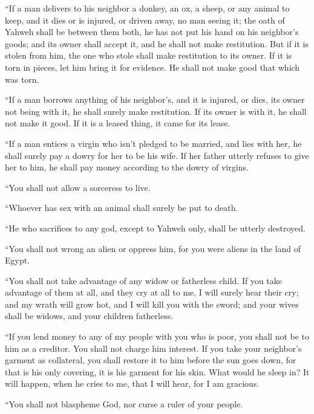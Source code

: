  ``If a man delivers to his neighbor a donkey, an ox, a
sheep, or any animal to keep, and it dies or is injured, or driven away,
no man seeing it;  the oath of Yahweh shall be between
them both, he has not put his hand on his neighbor's goods; and its
owner shall accept it, and he shall not make restitution.
 But if it is stolen from him, the one who stole shall
make restitution to its owner.  If it is torn in pieces,
let him bring it for evidence. He shall not make good that which was
torn.

 ``If a man borrows anything of his neighbor's, and it is
injured, or dies, its owner not being with it, he shall surely make
restitution.  If its owner is with it, he shall not make
it good. If it is a leased thing, it came for its lease.

 ``If a man entices a virgin who isn't pledged to be
married, and lies with her, he shall surely pay a dowry for her to be
his wife.  If her father utterly refuses to give her to
him, he shall pay money according to the dowry of virgins.

 ``You shall not allow a sorceress to live.

 ``Whoever has sex with an animal shall surely be put to
death.

 ``He who sacrifices to any god, except to Yahweh only,
shall be utterly destroyed.

 ``You shall not wrong an alien or oppress him, for you
were aliens in the land of Egypt.

 ``You shall not take advantage of any widow or
fatherless child.  If you take advantage of them at all,
and they cry at all to me, I will surely hear their cry; 
and my wrath will grow hot, and I will kill you with the sword; and your
wives shall be widows, and your children fatherless.

 ``If you lend money to any of my people with you who is
poor, you shall not be to him as a creditor. You shall not charge him
interest.  If you take your neighbor's garment as
collateral, you shall restore it to him before the sun goes down,
 for that is his only covering, it is his garment for his
skin. What would he sleep in? It will happen, when he cries to me, that
I will hear, for I am gracious.

 ``You shall not blaspheme God, nor curse a ruler of your
people.


